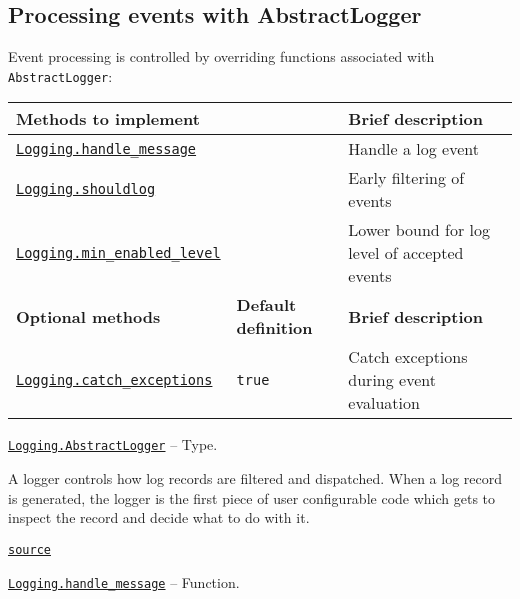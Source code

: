 \subsection{Processing events with AbstractLogger}



Event processing is controlled by overriding functions associated with \texttt{AbstractLogger}:




\begin{table}[h]

\begin{tabulary}{\linewidth}{|L|L|L|}
\hline
Methods to implement &  & Brief description \\
\hline
\hyperlink{1528450952930149457}{\texttt{Logging.handle\_message}} &  & Handle a log event \\
\hline
\hyperlink{10642364941499317938}{\texttt{Logging.shouldlog}} &  & Early filtering of events \\
\hline
\hyperlink{1177702033979282781}{\texttt{Logging.min\_enabled\_level}} &  & Lower bound for log level of accepted events \\
\hline
\textbf{Optional methods} & \textbf{Default definition} & \textbf{Brief description} \\
\hline
\hyperlink{13546483368377724892}{\texttt{Logging.catch\_exceptions}} & \texttt{true} & Catch exceptions during event evaluation \\
\hline
\end{tabulary}

\end{table}


\hypertarget{16983066617679297643}{}
\hyperlink{16983066617679297643}{\texttt{Logging.AbstractLogger}}  -- {Type.}

\begin{adjustwidth}{2em}{0pt}

A logger controls how log records are filtered and dispatched.  When a log record is generated, the logger is the first piece of user configurable code which gets to inspect the record and decide what to do with it.



\href{https://github.com/JuliaLang/julia/blob/9058264a69f9efc1af805c4473c946f87859b731/base/logging.jl#L24-L28}{\texttt{source}}


\end{adjustwidth}
\hypertarget{1528450952930149457}{}
\hyperlink{1528450952930149457}{\texttt{Logging.handle\_message}}  -- {Function.}

